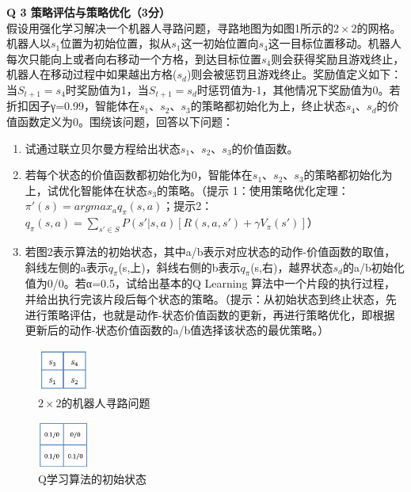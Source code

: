 \documentclass[a4paper, 11pt]{article}
\newenvironment{problem}[2][Q]
    { \begin{mdframed}[backgroundcolor=gray!20] \textbf{#1 #2} \\}
    {  \end{mdframed}}
\begin{document}
\begin{CJK}{UTF8}{gbsn}
\begin{problem}{3 策略评估与策略优化（3分）}
假设用强化学习解决一个机器人寻路问题，寻路地图为如图1所示的$2\times2$的网格。机器人以$s_1$位置为初始位置，拟从$s_1$这一初始位置向$s_4$这一目标位置移动。机器人每次只能向上或者向右移动一个方格，到达目标位置$s_4$则会获得奖励且游戏终止，机器人在移动过程中如果越出方格($s_d$)则会被惩罚且游戏终止。奖励值定义如下：当$S_{t+1}=s_4$时奖励值为1，当$S_{t+1}=s_d$时惩罚值为-1，其他情况下奖励值为0。若折扣因子γ=0.99，智能体在$s_1$、$s_2$、$s_3$的策略都初始化为上，终止状态$s_4$、$s_d$的价值函数定义为0。围绕该问题，回答以下问题：
\begin{enumerate}
\item 试通过联立贝尔曼方程给出状态$s_1$、$s_2$、$s_3$的价值函数。
\item 若每个状态的价值函数都初始化为0，智能体在$s_1$、$s_2$、$s_3$的策略都初始化为上，试优化智能体在状态$s_3$的策略。（提示 1：使用策略优化定理：$\pi'(s)=argmax_a q_\pi (s,a)$；提示2：$q_\pi(s,a)=\sum_{s'\in S} P(s'|s,a)[R(s,a,s' )+\gamma V_\pi (s' )]$）
\item 若图2表示算法的初始状态，其中a/b表示对应状态的动作-价值函数的取值，斜线左侧的a表示$q_{\pi}$(s,上)，斜线右侧的b表示$q_{\pi}$(s,右)，越界状态$s_d$的a/b初始化值为0/0。若α=0.5，试给出基本的Q Learning 算法中一个片段的执行过程，并给出执行完该片段后每个状态的策略。（提示：从初始状态到终止状态，先进行策略评估，也就是动作-状态价值函数的更新，再进行策略优化，即根据更新后的动作-状态价值函数的a/b值选择该状态的最优策略。）
\end{enumerate}


\begin{figure}[H]
    \centering
    \includegraphics[width=0.15\textwidth]{P1.PNG}
    \caption{$2\times2$的机器人寻路问题}
    \label{fig:my_label}
\end{figure}

\begin{figure}[H]
    \centering
    \includegraphics[width=0.15\textwidth]{P2.PNG}
    \caption{Q学习算法的初始状态}
    \label{fig:my_label} 
\end{figure}


\end{problem}
\end{CJK}
\end{document}
